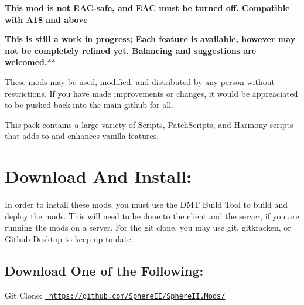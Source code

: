 \begin{center}{\bfseries{This mod is not E\+A\+C-\/safe, and E\+AC must be turned off. Compatible with A18 and above}}\end{center} 

\begin{center}{\bfseries{This is still a work in progress; Each feature is available, however may not be completely refined yet. Balancing and suggestions are welcomed.$\ast$$\ast$}}\end{center} 

These mods may be used, modified, and distributed by any person without restrictions. If you have made improvements or changes, it would be appreaciated to be pushed back into the main github for all.

This pack contains a large variety of Scripts, Patch\+Scripts, and Harmony scripts that adds to and enhances vanilla features.



 \hypertarget{index_autotoc_md9}{}\section{Download And Install\+:  }\label{index_autotoc_md9}
In order to install these mods, you must use the D\+MT Build Tool to build and deploy the mods. This will need to be done to the client and the server, if you are running the mods on a server. For the git clone, you may use git, gitkracken, or Github Desktop to keep up to date.\hypertarget{index_autotoc_md10}{}\subsection{Download One of the Following\+:}\label{index_autotoc_md10}
Git Clone\+: \href{https://github.com/SphereII/SphereII.Mods/}{\texttt{ https\+://github.\+com/\+Sphere\+I\+I/\+Sphere\+I\+I.\+Mods/}}

